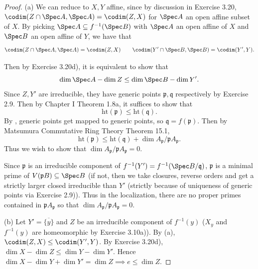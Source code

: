 \begin{proof}
	(a)
	We can reduce to $X,Y $ affine, since by discussion in Exercise 3.20, $\codim(Z\cap \Spec A, \Spec A) = \codim(Z,X) $ for $\Spec A $ an open affine subset of $X $.
	By picking $\Spec A \subseteq f^{-1}(\Spec B) $ with $\Spec A $ an open affine of $X $ and $\Spec B $ an open affine of $Y $, we have that
	\[
		\codim(Z\cap \Spec A, \Spec A) = \codim(Z,X) \qquad \codim(Y'\cap \Spec B, \Spec B) = \codim(Y',Y)
	.\]

	Then by Exercise 3.20d), it is equivalent to show that
	\[
		\dim \Spec A - \dim Z \le \dim \Spec B - \dim Y'
	.\]
	Since $Z,Y' $ are irreducible, they have generic points $\mathfrak{p},\mathfrak{q} $ respectively by Exercise 2.9.
	Then by Chapter I Theorem 1.8a, it suffices to show that
	\[
		\text{ht}(\mathfrak{p}) \le \text{ht}(\mathfrak{q})
	.\]
	By , generic points get mapped to generic points, so $\mathfrak{q} = f(\mathfrak{p}) $.
	Then by Matsumura Commutative Ring Theory Theorem 15.1,
	\[
		\text{ht}(\mathfrak{p}) \le \text{ht}(\mathfrak{q}) + \dim A_ \mathfrak{p} / \mathfrak{p}A _{\mathfrak{p}}
	.\]
	Thus we wish to show that $\dim A_ \mathfrak{p} / \mathfrak{p}A _{\mathfrak{p}} =0$.

	Since $\mathfrak{p} $ is an irreducible component of $f^{-1}(Y') = f^{-1}(\Spec B / \mathfrak{q})$, $\mathfrak{p} $ is a minimal prime of $V(\mathfrak{p}B) \subseteq \Spec B $ (if not, then we take closures, reverse orders and get a strictly larger closed irreducible than $Y' $ (strictly because of uniqueness of generic points via Exercise 2.9)).
	Thus in the localization, there are no proper primes contained in $\mathfrak{p}A_{\mathfrak{p}} $ so that $\dim A_ \mathfrak{p} / \mathfrak{p}A _{\mathfrak{p}} =0 $.

	(b)
	Let $Y' = \overline{\{y\}}   $ and $Z$ be an irreducible component of $f^{-1}(y) $ ($X_y $ and $f^{-1}(y) $ are homeomorphic by Exercise 3.10a)).
	By (a), $\codim(Z,X) \le \codim(Y', Y) $.
	By Exercise 3.20d), $\dim X - \dim Z\le \dim Y - \dim Y'$.
	Hence $\dim X - \dim Y + \dim Y' = \dim Z \implies e \le \dim Z$.


\end{proof}
